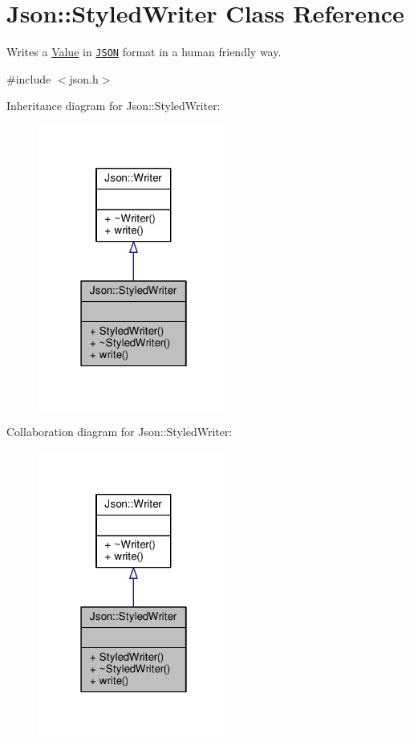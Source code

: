 \hypertarget{classJson_1_1StyledWriter}{}\section{Json\+:\+:Styled\+Writer Class Reference}
\label{classJson_1_1StyledWriter}


Writes a \hyperlink{classJson_1_1Value}{Value} in \href{http://www.json.org}{\tt J\+S\+ON} format in a human friendly way.  




{\ttfamily \#include $<$json.\+h$>$}



Inheritance diagram for Json\+:\+:Styled\+Writer\+:
\nopagebreak
\begin{figure}[H]
\begin{center}
\leavevmode
\includegraphics[width=178pt]{df/d9d/classJson_1_1StyledWriter__inherit__graph}
\end{center}
\end{figure}


Collaboration diagram for Json\+:\+:Styled\+Writer\+:
\nopagebreak
\begin{figure}[H]
\begin{center}
\leavevmode
\includegraphics[width=178pt]{d7/df3/classJson_1_1StyledWriter__coll__graph}
\end{center}
\end{figure}
